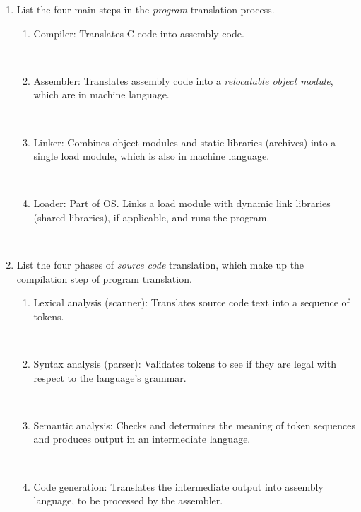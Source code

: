 \begin{enumerate}
	\item List the four main steps in the {\it program} translation process.
	\begin{enumerate}
		\item \begin{answer}Compiler: Translates C code into assembly code.\end{answer}\\
		\item \begin{answer}Assembler: Translates assembly code into a {\it relocatable object module}, which are in machine language.\end{answer}\\
		\item \begin{answer}Linker: Combines object modules and static libraries (archives) into a single load module, which is also in machine language.\end{answer}\\
		\item \begin{answer}Loader: Part of OS. Links a load module with dynamic link libraries (shared libraries), if applicable, and runs the program.\end{answer}\\
	\end{enumerate}

	\item List the four phases of {\it source code} translation, which make up the compilation step of program translation.
	\begin{enumerate}
		\item \begin{answer}Lexical analysis (scanner): Translates source code text into a sequence of tokens.\end{answer}\\
		\item \begin{answer}Syntax analysis (parser): Validates tokens to see if they are legal with respect to the language's grammar.\end{answer}\\
		\item \begin{answer}Semantic analysis: Checks and determines the meaning of token sequences and produces output in an intermediate language.\end{answer}\\
		\item \begin{answer}Code generation: Translates the intermediate output into assembly language, to be processed by the assembler.\end{answer}\\
	\end{enumerate}
\end{enumerate}